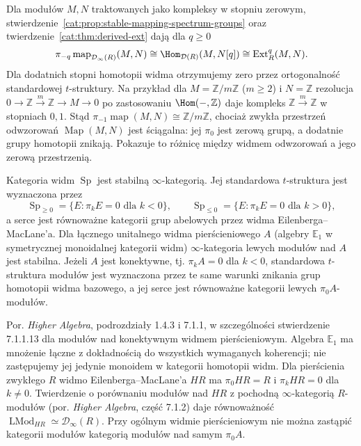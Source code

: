 \begin{przyklad}\label{cat:ex:stable-infty-derived-ext}
Dla modułów $M,N$ traktowanych jako kompleksy w stopniu zerowym, stwierdzenie~\ref{cat:prop:stable-mapping-spectrum-groups} oraz twierdzenie~\ref{cat:thm:derived-ext} dają dla $q\geq0$
\[
 \pi_{-q}\operatorname{map}_{\mathcal D_\infty(R)}(M,N)
 \cong\Hom_{\mathcal D(R)}(M,N[q])
 \cong\operatorname{Ext}^q_R(M,N).
\]
Dla dodatnich stopni homotopii widma otrzymujemy zero przez ortogonalność standardowej $t$-struktury. Na przykład dla $M=\mathbb Z/m\mathbb Z$ ($m\geq2$) i $N=\mathbb Z$ rezolucja $0\to\mathbb Z\xrightarrow{m}\mathbb Z\to M\to0$ po zastosowaniu $\Hom(-,\mathbb Z)$ daje kompleks $\mathbb Z\xrightarrow{m}\mathbb Z$ w stopniach $0,1$. Stąd $\pi_{-1}\operatorname{map}(M,N)\cong\mathbb Z/m\mathbb Z$, chociaż zwykła przestrzeń odwzorowań $\operatorname{Map}(M,N)$ jest ściągalna: jej $\pi_0$ jest zerową grupą, a dodatnie grupy homotopii znikają. Pokazuje to różnicę między widmem odwzorowań a jego zerową przestrzenią.
\end{przyklad}

\begin{twierdzenie}\label{cat:thm:stable-spectra-modules}
Kategoria widm $\operatorname{Sp}$ jest stabilną $\infty$-kategorią. Jej standardowa $t$-struktura jest wyznaczona przez
\[
 \operatorname{Sp}_{\geq0}=\{E:\pi_kE=0\text{ dla } k<0\},\qquad
 \operatorname{Sp}_{\leq0}=\{E:\pi_kE=0\text{ dla } k>0\},
\]
a serce jest równoważne kategorii grup abelowych przez widma Eilenberga--MacLane'a. Dla łącznego unitalnego widma pierścieniowego $A$ (algebry $\mathbb E_1$ w symetrycznej monoidalnej kategorii widm) $\infty$-kategoria lewych modułów nad $A$ jest stabilna. Jeżeli $A$ jest konektywne, tj. $\pi_k A=0$ dla $k<0$, standardowa $t$-struktura modułów jest wyznaczona przez te same warunki znikania grup homotopii widma bazowego, a jej serce jest równoważne kategorii lewych $\pi_0 A$-modułów.
\end{twierdzenie}
Por. \emph{Higher Algebra}, podrozdziały 1.4.3 i 7.1.1, w szczególności stwierdzenie 7.1.1.13 dla modułów nad konektywnym widmem pierścieniowym. Algebra $\mathbb E_1$ ma mnożenie łączne z dokładnością do wszystkich wymaganych koherencji; nie zastępujemy jej jedynie monoidem w kategorii homotopii widm. Dla pierścienia zwykłego $R$ widmo Eilenberga--MacLane'a $HR$ ma $\pi_0 HR=R$ i $\pi_k HR=0$ dla $k\ne0$. Twierdzenie o porównaniu modułów nad $HR$ z pochodną $\infty$-kategorią $R$-modułów (por. \emph{Higher Algebra}, część 7.1.2) daje równoważność $\operatorname{LMod}_{HR}\simeq\mathcal D_\infty(R)$. Przy ogólnym widmie pierścieniowym nie można zastąpić kategorii modułów kategorią modułów nad samym $\pi_0 A$.

